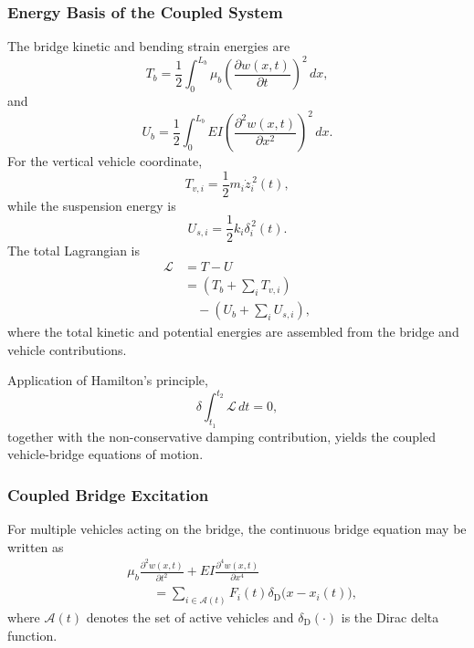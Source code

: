 \documentclass[journal]{IEEEtran}
\begin{document}
\subsubsection{Energy Basis of the Coupled System}

The bridge kinetic and bending strain energies are
\begin{equation}
T_b=\frac{1}{2}\int_{0}^{L_b}\mu_b\left(\frac{\partial w(x,t)}{\partial t}\right)^2\,dx,
\end{equation}
and
\begin{equation}
U_b=\frac{1}{2}\int_{0}^{L_b}EI\left(\frac{\partial^2 w(x,t)}{\partial x^2}\right)^2\,dx.
\end{equation}
For the vertical vehicle coordinate,
\begin{equation}
T_{v,i}=\frac{1}{2}m_i\dot{z}_i^{\,2}(t),
\end{equation}
while the suspension energy is
\begin{equation}
U_{s,i}=\frac{1}{2}k_i\delta_i^{\,2}(t).
\end{equation}
The total Lagrangian is
\begin{equation}
\begin{aligned}
\mathcal{L}&=T-U\\
&=\left(T_b+\sum_i T_{v,i}\right)\\
&\quad-\left(U_b+\sum_i U_{s,i}\right),
\end{aligned}
\end{equation}
where the total kinetic and potential energies are assembled from the bridge and vehicle contributions.

Application of Hamilton's principle,
\begin{equation}
\delta\int_{t_1}^{t_2}\mathcal{L}\,dt=0,
\end{equation}
together with the non-conservative damping contribution, yields the coupled vehicle-bridge equations of motion.

\subsubsection{Coupled Bridge Excitation}

For multiple vehicles acting on the bridge, the continuous bridge equation may be written as
\begin{equation}
\begin{aligned}
&\mu_b\frac{\partial^2 w(x,t)}{\partial t^2}+EI\frac{\partial^4 w(x,t)}{\partial x^4}\\
&\qquad=\sum_{i\in\mathcal{A}(t)}F_i(t)\delta_{\mathrm{D}}\bigl(x-x_i(t)\bigr),
\end{aligned}
\end{equation}
where $\mathcal{A}(t)$ denotes the set of active vehicles and $\delta_{\mathrm{D}}(\cdot)$ is the Dirac delta function.
\end{document}
